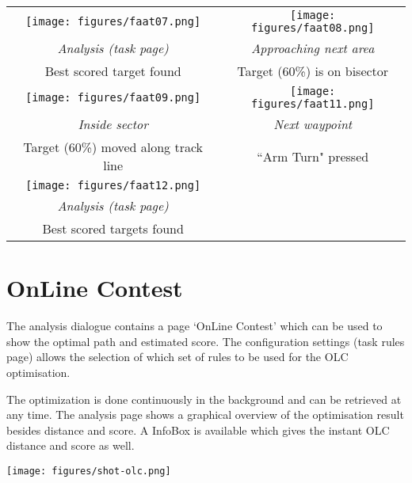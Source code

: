 \begin{maxipage}
\begin{center}
\begin{longtable}{|c|c|}
\toprule
\texttt{[image: figures/faat07.png]} &
\texttt{[image: figures/faat08.png]} \\
{\em Analysis (task page)} & {\em Approaching next area} \\
Best scored target found & Target (60\%) is on bisector \\

\midrule
\texttt{[image: figures/faat09.png]} &
\texttt{[image: figures/faat11.png]} \\
{\em Inside sector} & {\em Next waypoint} \\
Target (60\%) moved along track line & ``Arm Turn" pressed \\

\midrule
\texttt{[image: figures/faat12.png]} &  \\
{\em Analysis (task page)} &  \\
Best scored targets found &  \\

\bottomrule
\end{longtable}
\end{center}
\end{maxipage}

\section{OnLine Contest}

The analysis dialogue contains a page `OnLine Contest' which can be
used to show the optimal path and estimated score.  The configuration settings 
(task rules page) allows the selection of which set of rules to be used for the
OLC optimisation.

The optimization is done continuously in the background and can be retrieved at
any time. The analysis page shows a graphical overview of the optimisation
result besides distance and score. A InfoBox is available which gives the
instant OLC distance and score as well.

\begin{center}
\texttt{[image: figures/shot-olc.png]}
\end{center}

